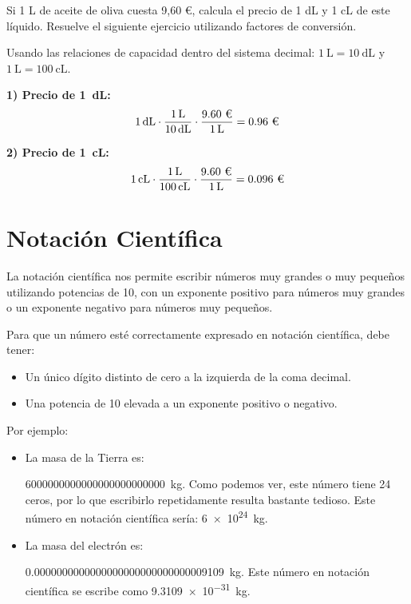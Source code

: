 \begin{exercise}
    Si 1 L de aceite de oliva cuesta 9,60 €, calcula el precio de 1 dL y 1 cL de este líquido. Resuelve el siguiente ejercicio utilizando factores de conversión.

    \begin{solu}
        Usando las relaciones de capacidad dentro del sistema decimal: \( \qty{1}{\L} = \qty{10}{\deci\L} \) y \( \qty{1}{\L} = \qty{100}{\centi\L} \).

        \textbf{1) Precio de \qty{1}{\deci\L}:}
        \[
        \qty{1}{\cancel{\deci\L}} \cdot
        \frac{\qty{1}{\cancel{\L}}}{\qty{10}{\cancel{\deci\L}}} \cdot
        \frac{\text{9.60 €}}{\qty{1}{\cancel{\L}}}
        = \text{0.96 €}
        \]

        \textbf{2) Precio de \qty{1}{\centi\L}:}
        \[
        \qty{1}{\cancel{\centi\L}} \cdot
        \frac{\qty{1}{\cancel{\L}}}{\qty{100}{\cancel{\centi\L}}} \cdot
        \frac{\text{9.60 €}}{\qty{1}{\cancel{\L}}}
        = \text{0.096 €}
        \]
    \end{solu}

\end{exercise}


\section{Notación Científica}

La notación científica nos permite escribir números muy grandes o muy pequeños utilizando potencias de \num{10}, con un exponente positivo para números muy grandes o un exponente negativo para números muy pequeños.

Para que un número esté correctamente expresado en notación científica, debe tener:

\begin{itemize}
    \item Un único dígito distinto de cero a la izquierda de la coma decimal.
    \item Una potencia de 10 elevada a un exponente positivo o negativo.
\end{itemize}

Por ejemplo:

\begin{itemize}
    \item La masa de la Tierra es:

    \qty{6000000000000000000000000}{\kilo\g}.
    Como podemos ver, este número tiene 24 ceros, por lo que escribirlo repetidamente resulta bastante tedioso.
    Este número en notación científica sería: \qty{6e24}{\kilo\g}.

    \item La masa del electrón es:

    \qty{0.0000000000000000000000000000009109}{\kilo\g}.
    Este número en notación científica se escribe como \qty{9.3109e-31}{\kilo\g}.
\end{itemize}

